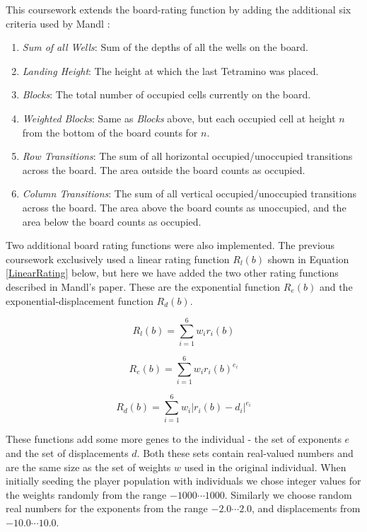 \documentclass[a4paper,11pt]{article}
\newcounter{savedcounter}
\begin{document}
This coursework extends the board-rating function by adding the additional six
criteria used by Mandl \cite{Mandl2005}:

\begin{enumerate}
  \setcounter{enumi}{\thesavedcounter}
  \item \emph{Sum of all Wells}: Sum of the depths of all the wells on the board.
  \item \emph{Landing Height}: The height at which the last Tetramino was placed.
  \item \emph{Blocks}: The total number of occupied cells currently on the board.
  \item \emph{Weighted Blocks}: Same as \emph{Blocks} above, but each occupied
      cell at height $n$ from the bottom of the board counts for $n$.
  \item \emph{Row Transitions}: The sum of all horizontal occupied/unoccupied
      transitions across the board.
      The area outside the board counts as occupied.
  \item \emph{Column Transitions}: The sum of all vertical occupied/unoccupied
      transitions across the board.
      The area above the board counts as unoccupied, and the area below the
      board counts as occupied.
\end{enumerate}

Two additional board rating functions were also implemented.
The previous coursework exclusively used a linear rating function $R_l(b)$
shown in Equation \ref{LinearRating} below, but here we have added the two
other rating functions described in Mandl's paper.
These are the exponential function $R_e(b)$ and the exponential-displacement
function $R_d(b)$.


\begin{equation}
\label{LinearRating}
  R_l(b) = \sum^6_{i=1} w_ir_i(b)
\end{equation}

\begin{equation}
\label{ExponentialRating}
  R_e(b) = \sum^6_{i=1} w_ir_i(b)^{e_i}
\end{equation}

\begin{equation}
\label{DisplacementRating}
  R_d(b) = \sum^6_{i=1} w_i \lvert r_i(b) - d_i \rvert ^{e_i}
\end{equation}

These functions add some more genes to the individual - the set of exponents
$e$ and the set of displacements $d$.
Both these sets contain real-valued numbers and are the same size as the set of
weights $w$ used in the original individual.
When initially seeding the player population with individuals we chose integer
values for the weights randomly from the range $-1000 \cdots 1000$.
Similarly we choose random real numbers for the exponents from the range
$-2.0 \cdots 2.0$, and displacements from $-10.0 \cdots 10.0$.
\end{document}
